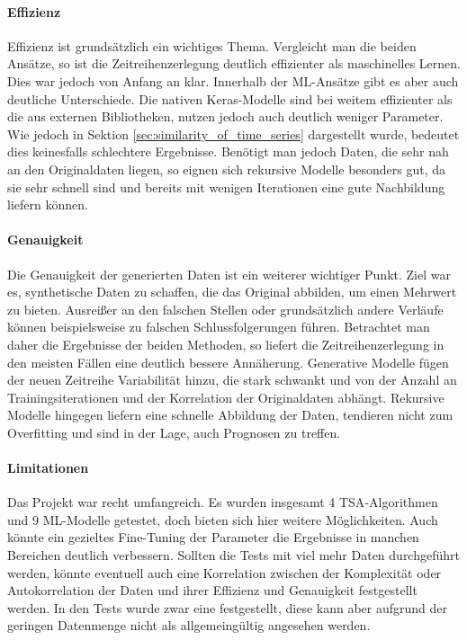 \paragraph*{Effizienz}
Effizienz ist grundsätzlich ein wichtiges Thema.
Vergleicht man die beiden Ansätze, so ist die Zeitreihenzerlegung deutlich effizienter als maschinelles Lernen. Dies war jedoch von Anfang an klar. 
Innerhalb der \ac{ML}-Ansätze gibt es aber auch deutliche Unterschiede. Die nativen Keras-Modelle sind bei weitem effizienter als die aus externen Bibliotheken, nutzen jedoch auch deutlich weniger Parameter.
Wie jedoch in Sektion \ref{sec:similarity_of_time_series} dargestellt wurde, bedeutet dies keinesfalls schlechtere Ergebnisse. Benötigt man jedoch Daten, die sehr nah an den Originaldaten liegen, 
so eignen sich rekursive Modelle besonders gut, da sie sehr schnell sind und bereits mit wenigen Iterationen eine gute Nachbildung liefern können.

\paragraph*{Genauigkeit}
Die Genauigkeit der generierten Daten ist ein weiterer wichtiger Punkt.
Ziel war es, synthetische Daten zu schaffen, die das Original abbilden, um einen Mehrwert zu bieten. Ausreißer an den falschen Stellen oder grundsätzlich andere Verläufe 
können beispielsweise zu falschen Schlussfolgerungen führen.
Betrachtet man daher die Ergebnisse der beiden Methoden, so liefert die Zeitreihenzerlegung in den meisten Fällen eine deutlich bessere Annäherung. Generative Modelle fügen der neuen Zeitreihe 
Variabilität hinzu, die stark schwankt und von der Anzahl an Trainingsiterationen und der Korrelation der Originaldaten abhängt.
Rekursive Modelle hingegen liefern eine schnelle Abbildung der Daten, tendieren nicht zum Overfitting und sind in der Lage, auch Prognosen zu treffen.

\paragraph*{Limitationen}
Das Projekt war recht umfangreich. Es wurden insgesamt 4 \ac{TSA}-Algorithmen und 9 \ac{ML}-Modelle getestet, doch bieten sich hier weitere Möglichkeiten. Auch könnte ein gezieltes 
Fine-Tuning der Parameter die Ergebnisse in manchen Bereichen deutlich verbessern.
Sollten die Tests mit viel mehr Daten durchgeführt werden, könnte eventuell auch eine Korrelation zwischen der Komplexität oder Autokorrelation der Daten und ihrer Effizienz und Genauigkeit 
festgestellt werden. In den Tests wurde zwar eine festgestellt, diese kann aber aufgrund der geringen Datenmenge nicht als allgemeingültig angesehen werden.


